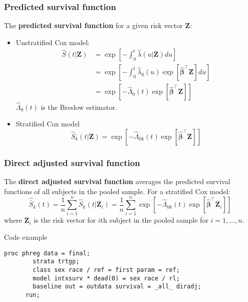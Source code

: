 \documentclass[11pt, aspectratio = 169]{beamer}
\begin{document}
\begin{frame}
  \frametitle{Predicted survival function}
  The \textbf{predicted survival function} for a given risk vector $\mathbf{Z}$:
  \begin{itemize}
    \item Unstratified Cox model:
    \begin{equation*}
      \begin{split}
        \hat{S}(t|\mathbf{Z}) & = \exp\left[-\int_0^t\hat{\lambda}(u|\mathbf{Z})du\right] \\
        & = \exp\left[-\int_0^t\hat{\lambda}_{0}(u)\exp\left[\hat{\boldsymbol{\beta}}^\top\mathbf{Z}\right]du\right] \\
        & = \exp\left[-\hat{\Lambda}_{0}(t)\exp\left[\hat{\boldsymbol{\beta}}^\top\mathbf{Z}\right]\right]
      \end{split}
    \end{equation*}
    $\hat{\Lambda}_{0}(t)$ is the Breslow estimator.
    \item Stratified Cox model
    \begin{equation*}
      \hat{S}_k(t|\mathbf{Z}) = \exp\left[-\hat{\Lambda}_{0k}(t)\exp\left[\hat{\boldsymbol{\beta}}^\top\mathbf{Z}\right]\right]
    \end{equation*}
  \end{itemize}
\end{frame}

\begin{frame}[fragile]
  \frametitle{Direct adjusted survival function}
  The \textbf{direct adjusted survival function} averages the predicted survival functions of all subjects in the pooled sample. For a stratified Cox model:
  \begin{equation*}
    \hat{\bar{S}}_k(t) = \frac{1}{n} \sum_{i = 1}^{n} \hat{S}_k(t|\mathbf{Z}_i) = \frac{1}{n} \sum_{i = 1}^{n} \exp\left[-\hat{\Lambda}_{0k}(t)\exp\left[\hat{\boldsymbol{\beta}}^\top\mathbf{Z}_{i}\right]\right]
  \end{equation*}
  where $\mathbf{Z}_{i}$ is the risk vector for $i$th subject in the pooled sample for $i = 1,\dotsc,n$.
  \begin{block}{Code example}
    \begin{lstlisting}[gobble = 6]
      proc phreg data = final;
        strata trtgp;
        class sex race / ref = first param = ref;
        model intxsurv * dead(0) = sex race / rl;
        baseline out = outdata survival = _all_ diradj;
      run;
    \end{lstlisting}
  \end{block}
\end{frame}
\end{document}
